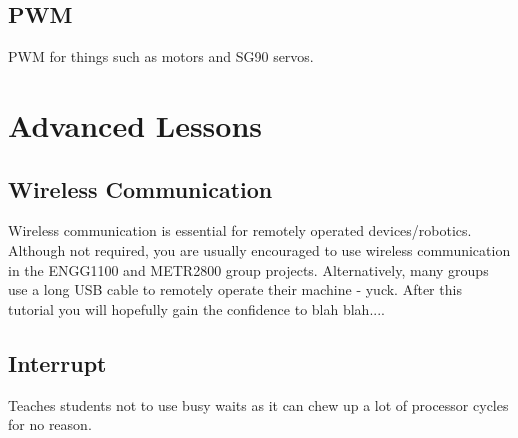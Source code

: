 \documentclass[11pt]{article}
\begin{document}
\subsection*{PWM}
PWM for things such as motors and SG90 servos.


\section*{Advanced Lessons}

\subsection*{Wireless Communication}
Wireless communication is essential for remotely operated devices/robotics. 
Although not required, you are usually encouraged to use wireless 
communication in the ENGG1100 and METR2800 group projects.
Alternatively, many groups use a long USB cable to remotely operate their 
machine - yuck. After this tutorial you will hopefully gain the confidence to blah blah....

\subsection*{Interrupt}
Teaches students not to use busy waits as it can chew up a lot of processor cycles for no reason.
\end{document}

